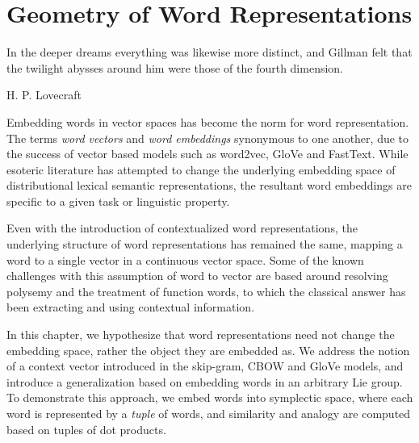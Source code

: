 \documentclass[11pt]{book}
\begin{document}
\chapter{Geometry of Word Representations}
\label{chapter:geometrization}

\epigraph{In the deeper dreams everything was likewise more distinct, and Gillman
felt that the twilight abysses around him were those of the fourth dimension.}{H. P. Lovecraft}


Embedding words in vector spaces has become the norm for
word representation. The
terms \emph{word vectors} and \emph{word embeddings} synonymous to one another,
due to the success of vector based models such as word2vec, GloVe and FastText.
While esoteric literature has
attempted to change the underlying embedding space of distributional lexical semantic representations,
the resultant word
embeddings are specific to a given task or linguistic property.

Even with the introduction of contextualized word representations, the
underlying structure of word representations has remained the same, mapping a
word to a single vector in a continuous vector space. Some of the known
challenges with this assumption of word to vector are based around
resolving polysemy and the treatment of function words, to which the classical
answer has been extracting and using contextual information.

In this chapter,
we hypothesize that word representations need not change the embedding space,
rather the object they are embedded as. We address the notion of a context
vector introduced in the skip-gram, CBOW and GloVe models, and introduce a
generalization based on embedding words in an arbitrary Lie group. To
demonstrate this approach, we embed words into symplectic space, where each
word is represented by a \emph{tuple} of words, and similarity and analogy are
computed based on tuples of dot products.

\end{document}
